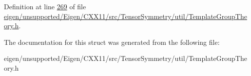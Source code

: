 Definition at line \hyperlink{eigen_2unsupported_2_eigen_2_c_x_x11_2src_2_tensor_symmetry_2util_2_template_group_theory_8h_source_l00269}{269} of file \hyperlink{eigen_2unsupported_2_eigen_2_c_x_x11_2src_2_tensor_symmetry_2util_2_template_group_theory_8h_source}{eigen/unsupported/\+Eigen/\+C\+X\+X11/src/\+Tensor\+Symmetry/util/\+Template\+Group\+Theory.\+h}.



The documentation for this struct was generated from the following file\+:\begin{DoxyCompactItemize}
\item 
eigen/unsupported/\+Eigen/\+C\+X\+X11/src/\+Tensor\+Symmetry/util/\+Template\+Group\+Theory.\+h\end{DoxyCompactItemize}
